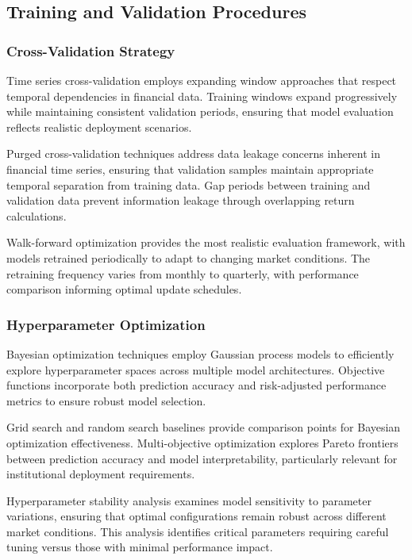\documentclass[conference]{IEEEtran}
\begin{document}
\subsection{Training and Validation Procedures}

\subsubsection{Cross-Validation Strategy}

Time series cross-validation employs expanding window approaches that respect temporal dependencies in financial data. Training windows expand progressively while maintaining consistent validation periods, ensuring that model evaluation reflects realistic deployment scenarios.

Purged cross-validation techniques address data leakage concerns inherent in financial time series, ensuring that validation samples maintain appropriate temporal separation from training data. Gap periods between training and validation data prevent information leakage through overlapping return calculations.

Walk-forward optimization provides the most realistic evaluation framework, with models retrained periodically to adapt to changing market conditions. The retraining frequency varies from monthly to quarterly, with performance comparison informing optimal update schedules.

\subsubsection{Hyperparameter Optimization}

Bayesian optimization techniques employ Gaussian process models to efficiently explore hyperparameter spaces across multiple model architectures. Objective functions incorporate both prediction accuracy and risk-adjusted performance metrics to ensure robust model selection.

Grid search and random search baselines provide comparison points for Bayesian optimization effectiveness. Multi-objective optimization explores Pareto frontiers between prediction accuracy and model interpretability, particularly relevant for institutional deployment requirements.

Hyperparameter stability analysis examines model sensitivity to parameter variations, ensuring that optimal configurations remain robust across different market conditions. This analysis identifies critical parameters requiring careful tuning versus those with minimal performance impact.
\end{document}
